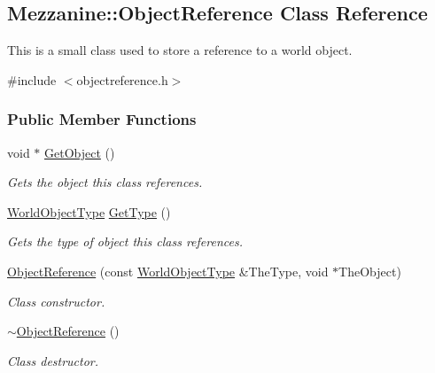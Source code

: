 \hypertarget{classMezzanine_1_1ObjectReference}{
\subsection{Mezzanine::ObjectReference Class Reference}
\label{classMezzanine_1_1ObjectReference}
}


This is a small class used to store a reference to a world object.  




{\ttfamily \#include $<$objectreference.h$>$}

\subsubsection*{Public Member Functions}
\begin{DoxyCompactItemize}
\item 
void $\ast$ \hyperlink{classMezzanine_1_1ObjectReference_a0e4981f938a3a5dadf3697a649ef3e70}{GetObject} ()
\begin{DoxyCompactList}\small\item\em Gets the object this class references. \item\end{DoxyCompactList}\item 
\hyperlink{namespaceMezzanine_a30335416fc857844e8360c84d1d1b56c}{WorldObjectType} \hyperlink{classMezzanine_1_1ObjectReference_af7bca8f5979bf073eb96aa80508973e4}{GetType} ()
\begin{DoxyCompactList}\small\item\em Gets the type of object this class references. \item\end{DoxyCompactList}\item 
\hyperlink{classMezzanine_1_1ObjectReference_a0df9dac796d3dcbf057ab64a1168abf7}{ObjectReference} (const \hyperlink{namespaceMezzanine_a30335416fc857844e8360c84d1d1b56c}{WorldObjectType} \&TheType, void $\ast$TheObject)
\begin{DoxyCompactList}\small\item\em Class constructor. \item\end{DoxyCompactList}\item 
\hypertarget{classMezzanine_1_1ObjectReference_aabb1fbfa7abe2d333c7946941368d2e3}{
\hyperlink{classMezzanine_1_1ObjectReference_aabb1fbfa7abe2d333c7946941368d2e3}{$\sim$ObjectReference} ()}
\label{classMezzanine_1_1ObjectReference_aabb1fbfa7abe2d333c7946941368d2e3}

\begin{DoxyCompactList}\small\item\em Class destructor. \item\end{DoxyCompactList}\end{DoxyCompactItemize}
